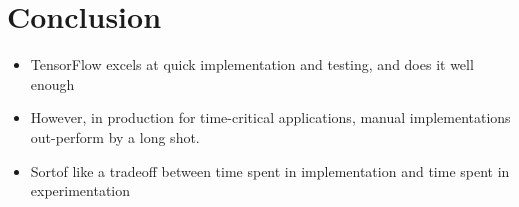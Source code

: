 \documentclass[12pt]{article}
\begin{document}
\section{Conclusion}

\begin{itemize}
	\item TensorFlow excels at quick implementation and testing, and does it well enough
	\item However, in production for time-critical applications, manual implementations out-perform by a long shot.
	\item Sortof like a tradeoff between time spent in implementation and time spent in experimentation
\end{itemize}


\newpage


\end{document}
